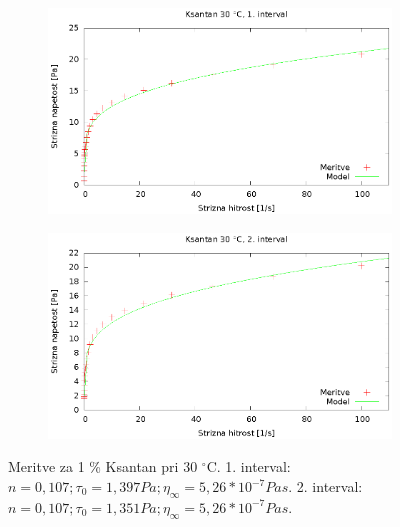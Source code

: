 \documentclass{article}
\begin{document}
\begin{figure}
	\centering
	\begin{subfigure}[b]{0.4\textwidth}
	       \includegraphics[width=\textwidth]{tok_ksan3.eps}
	   \end{subfigure}
	   \begin{subfigure}[b]{0.4\textwidth}
	       \includegraphics[width=\textwidth]{tok_ksan4.eps}
	   \end{subfigure}
	\caption{Meritve za 1 \% Ksantan pri 30 $^\circ$C. 1. interval: $n = 0,107; \tau_0 = 1,397 Pa; \eta_\infty = 5,26*10^{-7} Pa s$. 2. interval: $n = 0,107; \tau_0 = 1,351 Pa; \eta_\infty = 5,26*10^{-7} Pa s$.}
	\label{fig:tok_ksan2}
\end{figure}
\end{document}
